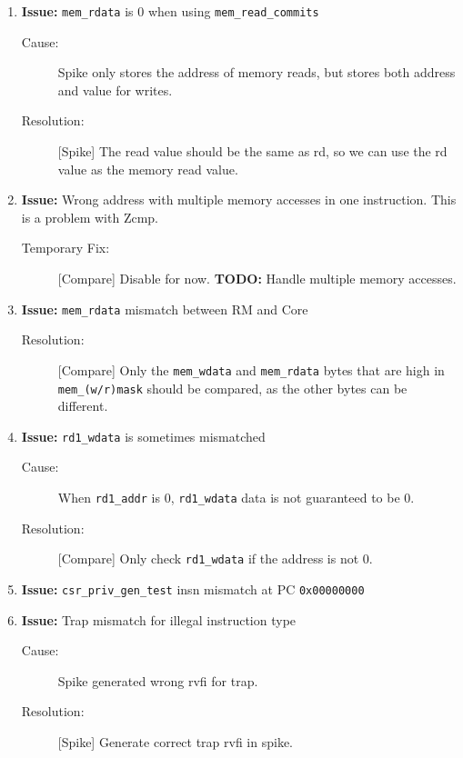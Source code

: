 \begin{enumerate}

\item \textbf{Issue:} \lstinline{mem_rdata} is 0 when using \lstinline{mem_read_commits}
  \begin{description}
    \item[Cause:] Spike only stores the address of memory reads, but stores both address and value for writes.
    \item[Resolution:] [Spike] The read value should be the same as rd, so we can use the rd value as the memory read value.
  \end{description}

\item \textbf{Issue:} Wrong address with multiple memory accesses in one instruction. This is a problem with Zcmp.
  \begin{description}
    \item[Temporary Fix:] [Compare] Disable for now. \textbf{TODO:} Handle multiple memory accesses.
  \end{description}

\item \textbf{Issue:} \lstinline{mem_rdata} mismatch between RM and Core
  \begin{description}
    \item[Resolution:] [Compare] Only the \lstinline{mem_wdata} and \lstinline{mem_rdata} bytes that are high in \lstinline{mem_(w/r)mask} should be compared, as the other bytes can be different.
  \end{description}

\item \textbf{Issue:} \lstinline{rd1_wdata} is sometimes mismatched
  \begin{description}
    \item[Cause:] When \lstinline{rd1_addr} is 0, \lstinline{rd1_wdata} data is not guaranteed to be 0.
    \item[Resolution:] [Compare] Only check \lstinline{rd1_wdata} if the address is not 0.
  \end{description}

\item \textbf{Issue:} \lstinline{csr_priv_gen_test} insn mismatch at PC \lstinline{0x00000000}

\item \textbf{Issue:} Trap mismatch for illegal instruction type
  \begin{description}
    \item[Cause:] Spike generated wrong rvfi for trap.
    \item[Resolution:] [Spike] Generate correct trap rvfi in spike.
  \end{description}


\end{enumerate}
